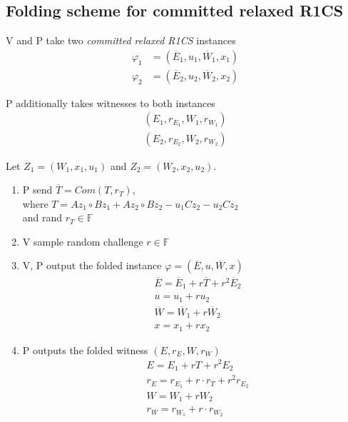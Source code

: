\documentclass{article}
\theoremstyle{definition}
\begin{document}
\subsection{Folding scheme for committed relaxed R1CS}

V and P take two \emph{committed relaxed R1CS} instances
\begin{align*}
	\varphi_1&=(\overline{E}_1, u_1, \overline{W}_1, x_1)\\
	\varphi_2&=(\overline{E}_2, u_2, \overline{W}_2, x_2)
\end{align*}

P additionally takes witnesses to both instances
\begin{align*}
	(E_1, r_{E_1}, W_1, r_{W_1})\\
	(E_2, r_{E_2}, W_2, r_{W_2})
\end{align*}

Let $Z_1 = (W_1, x_1, u_1)$ and $Z_2 = (W_2, x_2, u_2)$.

\begin{enumerate}
	\item P send $\overline{T} = Com(T, r_T)$,\\
		where $T=A z_1 \circ B z_1 + A z_2 \circ B z_2 - u_1 C z_2 - u_2 C z_2$\\
		and rand $r_T \in \mathbb{F}$
	\item V sample random challenge $r \in \mathbb{F}$
	\item V, P output the folded instance $\varphi = (\overline{E}, u, \overline{W}, x)$
		\begin{align*}
			&\overline{E}=\overline{E}_1 + r \overline{T} + r^2 \overline{E}_2\\
			&u = u_1 + r u_2\\
			&\overline{W} = \overline{W}_1 + r \overline{W}_2\\
			&x = x_1 + r x_2
		\end{align*}
	\item P outputs the folded witness $(E, r_E, W, r_W)$
		\begin{align*}
			&E = E_1 + r T + r^2 E_2\\
			&r_E = r_{E_1} + r \cdot r_T + r^2 r_{E_2}\\
			&W=W_1 + r W_2\\
			&r_W = r_{W_1} + r \cdot r_{W_2}
		\end{align*}
\end{enumerate}
\end{document}
